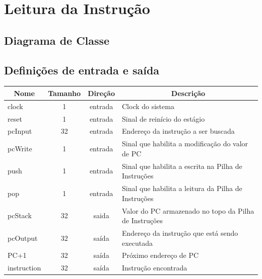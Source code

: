 \section{Leitura da Instrução}
	\subsection{Diagrama de Classe}
  \begin{figure}[h!]
    
  \end{figure}
		
		\subsection{Definições de entrada e saída}
		
	\begin{center}
		\begin{longtable}[pos]{| l | c | c | m{7cm} |} \hline
			\multicolumn{1}{|c|}{\cellcolor[gray]{0.9}\textbf{Nome}} & 
			\multicolumn{1}{c|}{\cellcolor[gray]{0.9}\textbf{Tamanho}} & 
			\multicolumn{1}{c|}{\cellcolor[gray]{0.9}\textbf{Direção}} &
			\multicolumn{1}{c|}{\cellcolor[gray]{0.9}\textbf{Descrição}} \\ \hline
			\endhead
			\hline
			\endlastfoot
			clock & 1 & entrada & Clock do sistema \\ \hline
			reset & 1 & entrada & Sinal de reinício do estágio\\ \hline
			pcInput & 32 & entrada & Endereço da instrução a ser buscada \\ \hline
			pcWrite & 1 & entrada & Sinal que habilita a modificação do valor de PC \\ \hline
			push & 1 & entrada & Sinal que habilita a escrita na Pilha de Instruções\\ \hline
			pop & 1 & entrada & Sinal que habilita a leitura da Pilha de Instruções\\ \hline
			pcStack & 32 & saida & Valor do PC armazenado no topo da Pilha de Instruções\\ \hline
			pcOutput & 32 & saída & Endereço da instrução que está sendo executada \\ \hline
			PC+1 & 32 & saída & Próximo endereço de PC \\ \hline
			instruction & 32 & saída & Instrução encontrada \\ \hline
			
		\end{longtable}
	\end{center}
	
